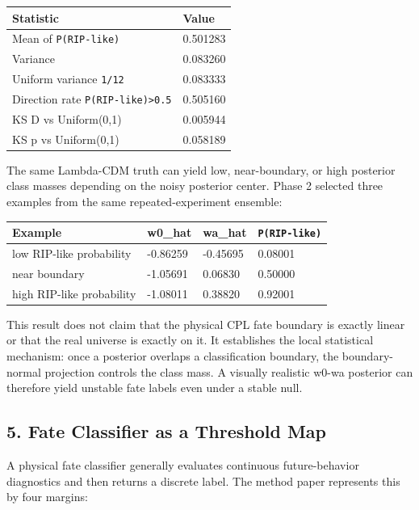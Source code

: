 \documentclass[
]{article}
\newcounter{none} %
\begin{document}
{\def\LTcaptype{none} %
\begin{longtable}[]{@{}ll@{}}
\toprule\noalign{}
Statistic & Value \\
\midrule\noalign{}
\endhead
\bottomrule\noalign{}
\endlastfoot
Mean of \texttt{P(RIP-like)} & 0.501283 \\
Variance & 0.083260 \\
Uniform variance \texttt{1/12} & 0.083333 \\
Direction rate \texttt{P(RIP-like)\textgreater{}0.5} & 0.505160 \\
KS D vs Uniform(0,1) & 0.005944 \\
KS p vs Uniform(0,1) & 0.058189 \\
\end{longtable}
}

The same Lambda-CDM truth can yield low, near-boundary, or high
posterior class masses depending on the noisy posterior center. Phase 2
selected three examples from the same repeated-experiment ensemble:

{\def\LTcaptype{none} %
\begin{longtable}[]{@{}llll@{}}
\toprule\noalign{}
Example & w0\_hat & wa\_hat & \texttt{P(RIP-like)} \\
\midrule\noalign{}
\endhead
\bottomrule\noalign{}
\endlastfoot
low RIP-like probability & -0.86259 & -0.45695 & 0.08001 \\
near boundary & -1.05691 & 0.06830 & 0.50000 \\
high RIP-like probability & -1.08011 & 0.38820 & 0.92001 \\
\end{longtable}
}

This result does not claim that the physical CPL fate boundary is
exactly linear or that the real universe is exactly on it. It
establishes the local statistical mechanism: once a posterior overlaps a
classification boundary, the boundary-normal projection controls the
class mass. A visually realistic w0-wa posterior can therefore yield
unstable fate labels even under a stable null.

\subsection{5. Fate Classifier as a Threshold
Map}\label{fate-classifier-as-a-threshold-map}

A physical fate classifier generally evaluates continuous
future-behavior diagnostics and then returns a discrete label. The
method paper represents this by four margins:
\end{document}
